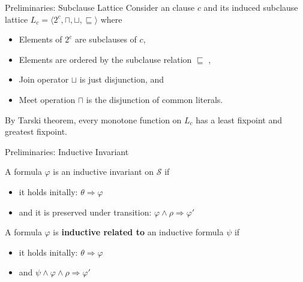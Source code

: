 \documentclass[aspectratio=1610, 13pt]{beamer}
\begin{document}
\begin{frame}{Preliminaries: Subclause Lattice}
Consider an clause $c$ and its induced subclause lattice $L_c = \langle 2^c, \sqcap, \sqcup, \sqsubseteq \rangle$ where 
\begin{itemize}
\item Elements of $2^c$ are subclauses of $c$,
\item Elements are ordered by the subclause relation $\sqsubseteq$ ,
\item Join operator $\sqcup$ is just disjunction, and
\item Meet operation $\sqcap$ is the disjunction of common literals.
\end{itemize}

By Tarski theorem,  every monotone function on $L_c$ has a least fixpoint and 	greatest fixpoint.


\end{frame}

\begin{frame}{Preliminaries: Inductive Invariant}
\begin{definition}
A formula $\varphi$ is an inductive invariant on $\mathcal{S}$ if
\begin{itemize}
\item it holds initally: $\theta \Rightarrow \varphi$
\item and it is preserved under transition: $\varphi \wedge \rho \Rightarrow \varphi'$

\end{itemize}
\end{definition}

A formula $\varphi$ is \textbf{inductive related to }an inductive formula $\psi$ if
\begin{itemize}
\item it holds initally: $\theta \Rightarrow \varphi$
\item and $\psi \wedge \varphi \wedge \rho \Rightarrow \varphi'$
\end{itemize}
\end{frame}
\end{document}
